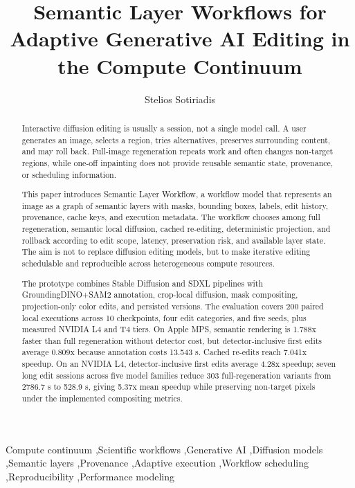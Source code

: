 \documentclass[final,5p,times,number,sort&compress]{elsarticle}
\newcommand{\systemname}{Semantic Layer Workflow}
\begin{document}
\begin{frontmatter}

\title{Semantic Layer Workflows for Adaptive Generative AI Editing in the Compute Continuum}

\author[inst1]{Stelios Sotiriadis}
\address[inst1]{School of Computing and Mathematical Sciences, Birkbeck, University of London, London, United Kingdom}

\begin{abstract}
Interactive diffusion editing is usually a session, not a single model call. A user generates an image, selects a region, tries alternatives, preserves surrounding content, and may roll back. Full-image regeneration repeats work and often changes non-target regions, while one-off inpainting does not provide reusable semantic state, provenance, or scheduling information.

This paper introduces \systemname{}, a workflow model that represents an image as a graph of semantic layers with masks, bounding boxes, labels, edit history, provenance, cache keys, and execution metadata. The workflow chooses among full regeneration, semantic local diffusion, cached re-editing, deterministic projection, and rollback according to edit scope, latency, preservation risk, and available layer state. The aim is not to replace diffusion editing models, but to make iterative editing schedulable and reproducible across heterogeneous compute resources.

The prototype combines Stable Diffusion and SDXL pipelines with GroundingDINO+SAM2 annotation, crop-local diffusion, mask compositing, projection-only color edits, and persisted versions. The evaluation covers 200 paired local executions across 10 checkpoints, four edit categories, and five seeds, plus measured NVIDIA L4 and T4 tiers. On Apple MPS, semantic rendering is 1.788x faster than full regeneration without detector cost, but detector-inclusive first edits average 0.809x because annotation costs 13.543 s. Cached re-edits reach 7.041x speedup. On an NVIDIA L4, detector-inclusive first edits average 4.28x speedup; seven long edit sessions across five model families reduce 303 full-regeneration variants from 2786.7 s to 528.9 s, giving 5.37x mean speedup while preserving non-target pixels under the implemented compositing metrics.
\end{abstract}

\begin{keyword}
Compute continuum \sep Scientific workflows \sep Generative AI \sep Diffusion models \sep Semantic layers \sep Provenance \sep Adaptive execution \sep Workflow scheduling \sep Reproducibility \sep Performance modeling
\end{keyword}

\end{frontmatter}
\end{document}
